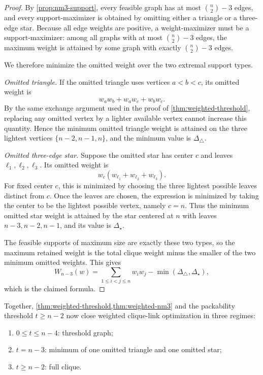 \documentclass[11pt]{article}
\theoremstyle{definition}
\begin{document}
\begin{proof}
By \cref{prop:nm3-support}, every feasible graph has at most \(\binom n2-3\) edges, and every support-maximizer is obtained by omitting either a triangle or a three-edge star. Because all edge weights are positive, a weight-maximizer must be a support-maximizer: among all graphs with at most \(\binom n2-3\) edges, the maximum weight is attained by some graph with exactly \(\binom n2-3\) edges.

We therefore minimize the omitted weight over the two extremal support types.

\smallskip
\noindent\emph{Omitted triangle.}
If the omitted triangle uses vertices \(a<b<c\), its omitted weight is
\[
w_aw_b+w_aw_c+w_bw_c.
\]
By the same exchange argument used in the proof of \cref{thm:weighted-threshold}, replacing any omitted vertex by a lighter available vertex cannot increase this quantity. Hence the minimum omitted triangle weight is attained on the three lightest vertices \(\{n-2,n-1,n\}\), and the minimum value is \(\Delta_\triangle\).

\smallskip
\noindent\emph{Omitted three-edge star.}
Suppose the omitted star has center \(c\) and leaves \(\ell_1,\ell_2,\ell_3\). Its omitted weight is
\[
w_c(w_{\ell_1}+w_{\ell_2}+w_{\ell_3}).
\]
For fixed center \(c\), this is minimized by choosing the three lightest possible leaves distinct from \(c\). Once the leaves are chosen, the expression is minimized by taking the center to be the lightest possible vertex, namely \(c=n\). Thus the minimum omitted star weight is attained by the star centered at \(n\) with leaves \(n-3,n-2,n-1\), and its value is \(\Delta_\star\).

The feasible supports of maximum size are exactly these two types, so the maximum retained weight is the total clique weight minus the smaller of the two minimum omitted weights. This gives
\[
W_{n-3}(w)=\sum_{1\le i<j\le n} w_iw_j-\min(\Delta_\triangle,\Delta_\star),
\]
which is the claimed formula.
\end{proof}

Together, \cref{thm:weighted-threshold,thm:weighted-nm3} and the packability threshold \(t\ge n-2\) now close weighted clique-link optimization in three regimes:
\begin{enumerate}[label=(\roman*)]
    \item \(0\le t\le n-4\): threshold graph;
    \item \(t=n-3\): minimum of one omitted triangle and one omitted star;
    \item \(t\ge n-2\): full clique.
\end{enumerate}
\end{document}
